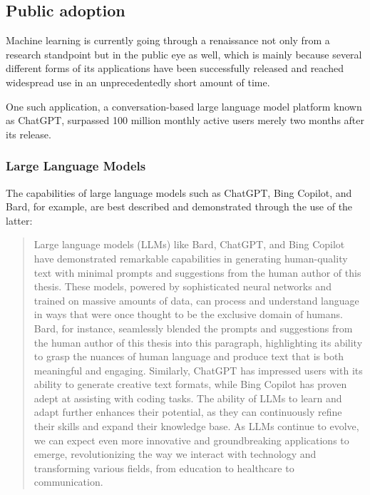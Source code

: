 \documentclass[masterthesis]{fer}
\begin{document}
\subsection{Public adoption}
Machine learning is currently going through a renaissance not only from a research standpoint but in the public eye as well, which is mainly because several different forms of its applications have been successfully released and reached widespread use in an unprecedentedly short amount of time.

One such application, a conversation-based large language model platform known as ChatGPT, surpassed 100 million monthly active users merely two months after its release.

\subsubsection{Large Language Models}
The capabilities of large language models such as ChatGPT, Bing Copilot, and Bard, for example, are best described and demonstrated through the use of the latter:

\begin{quote}
Large language models (LLMs) like Bard, ChatGPT,
and Bing Copilot have demonstrated remarkable
capabilities in generating human-quality text with
minimal prompts and suggestions from the human
author of this thesis. These models, powered by
sophisticated neural networks and trained on
massive amounts of data, can process and
understand language in ways that were once thought
to be the exclusive domain of humans. Bard, for
instance, seamlessly blended the prompts and
suggestions from the human author of this thesis
into this paragraph, highlighting its ability to
grasp the nuances of human language and produce
text that is both meaningful and engaging.
Similarly, ChatGPT has impressed users with its
ability to generate creative text formats, while
Bing Copilot has proven adept at assisting with
coding tasks. The ability of LLMs to learn and
adapt further enhances their potential, as they
can continuously refine their skills and expand
their knowledge base. As LLMs continue to evolve,
we can expect even more innovative and
groundbreaking applications to emerge,
revolutionizing the way we interact with
technology and transforming various fields, from
education to healthcare to communication.

\cite{bard2023}
\end{quote}
\end{document}
